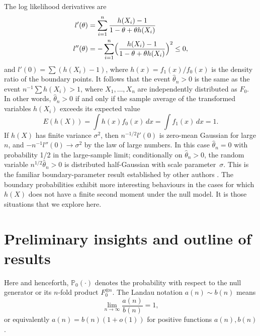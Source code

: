 \documentclass[11pt]{article}
\theoremstyle{definition}
\def\Prob{{\mathbb P}}
\begin{document}
The log likelihood derivatives are 
\begin{align}
\begin{split}\label{eqDeriv}
l'(\theta) &=  \sum_{i=1}^n \frac{h(X_i) - 1} {1-\theta + \theta h(X_i)}  \\
l''(\theta) &= -\sum_{i=1}^n \Bigl(\frac{h(X_i) - 1} {1-\theta + \theta h(X_i)}\Bigr)^2 \leq 0, 
\end{split}
\end{align}
and $l'(0) = \sum (h(X_i) - 1)$, where $h(x) = f_1(x)/f_0(x)$ is the density ratio of the boundary points. It follows that the event $\hat\theta_n > 0$ is the same as the event $n^{-1} \sum h(X_i) > 1$, where $X_1,\ldots, X_n$ are independently distributed as $F_0$. In other words, $\hat\theta_n > 0$ if and only if the sample average of the transformed variables $h(X_i)$ exceeds its expected value
\[
E (h(X)) = \int h(x) f_0(x)\, dx = 
\int f_1(x)\, dx = 1.
\]
If $h(X)$ has finite variance $\sigma^2$, then $n^{-1/2}l'(0)$ is zero-mean Gaussian for large $n$, and $-n^{-1}l''(0) \rightarrow \sigma^2$ by the law of large numbers. In this case $\hat\theta_n=0$ with probability 1/2 in the large-sample limit; conditionally on $\hat\theta_n>0$, the random variable $n^{1/2}\hat\theta_n>0$ is distributed half-Gaussian with scale parameter~$\sigma$. This is the familiar boundary-parameter result established by other authors \citep[e.g.][]{Chernoff1954,SelfLiang1987,Geyer1994}. The boundary probabilities exhibit more interesting behaviours in the cases for which $h(X)$ does not have a finite second moment under the null model. It is those situations that we explore here.

\section{Preliminary insights and outline of results}\label{secPrelim}

Here and henceforth, $\Prob_0(\cdot)$ denotes the probability with respect to the null generator or its $n$-fold product $F_0^{\otimes n}$. The Landau notation $a(n)\sim b(n)$ means 
\[
\lim_{n\rightarrow \infty} \frac{a(n)}{b(n)} = 1,
\]
or equivalently $a(n)=b(n)(1+o(1))$ for positive functions $a(n), b(n)$. 
\end{document}
